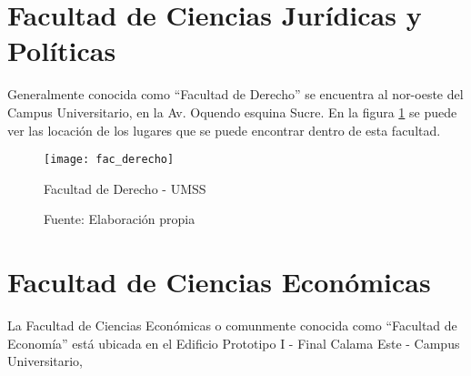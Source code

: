  \section{Facultad de Ciencias Jurídicas y Políticas}
 \label{sec:facultad_derecho}


 Generalmente conocida como ``Facultad de Derecho'' se encuentra al nor-oeste del Campus Universitario, en la Av. Oquendo esquina Sucre. En la figura \ref{fig:fac_derecho} se puede ver las locación de los lugares que se puede encontrar dentro de esta facultad.

 \begin{figure}[H]
   \begin{center}
     \texttt{[image: fac\_derecho]}
     \caption{Facultad de Derecho - UMSS}
     \label{fig:fac_derecho}
     \caption*{Fuente: Elaboración propia}
   \end{center}
 \end{figure}

 








\section{Facultad de Ciencias Económicas}
\label{sec:facultad_economia}

      La Facultad de Ciencias Económicas o comunmente conocida como ``Facultad de Economía'' está ubicada en el Edificio Prototipo I - Final Calama Este - Campus Universitario,

